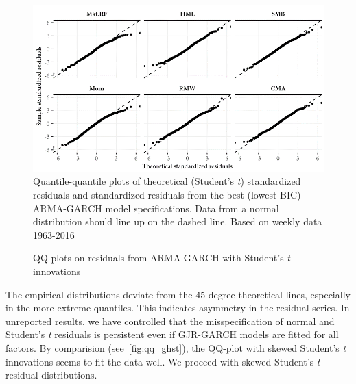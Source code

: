 \begin{figure}[H]
  \caption{QQ-plots on residuals from ARMA-GARCH with Student's \textit{t} innovations}
  \label{fig:qq_std}
  \centering
  \begin{minipage}{\textwidth}
  \includegraphics[scale=1]{graphics/qq_std.png}  
  \vspace{3mm}
  \footnotesize
  Quantile-quantile plots of theoretical (Student's \textit{t}) standardized residuals and standardized residuals from the best (lowest BIC) ARMA-GARCH model specifications. Data from a normal distribution should line up on the dashed line. Based on weekly data 1963-2016
  \end{minipage}
\end{figure}

The empirical distributions deviate from the 45 degree theoretical lines, especially in the more extreme quantiles. This indicates asymmetry in the residual series. In unreported results, we have controlled that the misspecification of normal and Student's \textit{t} residuals is persistent even if GJR-GARCH models are fitted for all factors. By comparision (see~\autoref{fig:qq_ghst}), the QQ-plot with skewed Student's \textit{t} innovations seems to fit the data well. We proceed with skewed Student's \textit{t} residual distributions.

